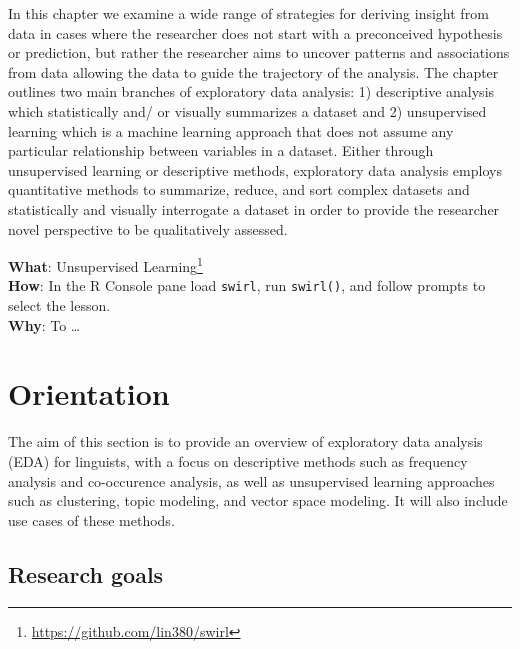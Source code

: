\documentclass[
  letterpaper,
]{latex/krantz}
\DeclareRobustCommand{\href}[2]{#2\footnote{\url{#1}}}
\begin{document}
In this chapter we examine a wide range of strategies for deriving
insight from data in cases where the researcher does not start with a
preconceived hypothesis or prediction, but rather the researcher aims to
uncover patterns and associations from data allowing the data to guide
the trajectory of the analysis. The chapter outlines two main branches
of exploratory data analysis: 1) descriptive analysis which
statistically and/ or visually summarizes a dataset and 2) unsupervised
learning which is a machine learning approach that does not assume any
particular relationship between variables in a dataset. Either through
unsupervised learning or descriptive methods, exploratory data analysis
employs quantitative methods to summarize, reduce, and sort complex
datasets and statistically and visually interrogate a dataset in order
to provide the researcher novel perspective to be qualitatively
assessed.

\begin{tcolorbox}[enhanced jigsaw, colbacktitle=quarto-callout-tip-color!10!white, arc=.35mm, toprule=.15mm, breakable, colframe=quarto-callout-tip-color-frame, bottomrule=.15mm, opacitybacktitle=0.6, coltitle=black, titlerule=0mm, colback=white, toptitle=1mm, bottomtitle=1mm, title=\textcolor{quarto-callout-tip-color}{\faLightbulb}\hspace{0.5em}{Swirl}, rightrule=.15mm, leftrule=.75mm, opacityback=0, left=2mm]

\textbf{What}: \href{https://github.com/lin380/swirl}{Unsupervised
Learning}\\
\textbf{How}: In the R Console pane load \texttt{swirl}, run
\texttt{swirl()}, and follow prompts to select the lesson.\\
\textbf{Why}: To \ldots{}

\end{tcolorbox}

\hypertarget{eda-orientation}{%
\section{Orientation}\label{eda-orientation}}

The aim of this section is to provide an overview of exploratory data
analysis (EDA) for linguists, with a focus on descriptive methods such
as frequency analysis and co-occurence analysis, as well as unsupervised
learning approaches such as clustering, topic modeling, and vector space
modeling. It will also include use cases of these methods.

\hypertarget{eda-research-goals}{%
\subsection{Research goals}\label{eda-research-goals}}
\end{document}
